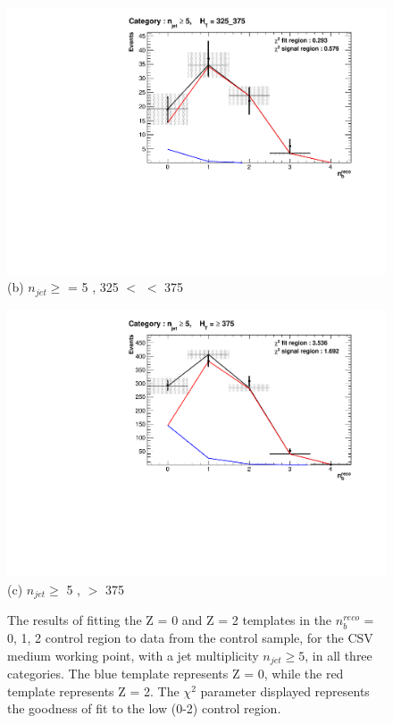 \begin{figure}[ht]
\footnotesize
\centering
\begin{minipage}[b]{0.50\linewidth}
\includegraphics[width = 1.0\linewidth]{plots/ThesisPlots/Final_Fit_To_Data_Normal_Medium_HTBin_OneMuon_325_375_jet_mult_5.pdf}
\centering (b) $n_{jet} \geq$ = 5 , 325 $<$ \theht $<$ 375 
\end{minipage}
\footnotesize
\begin{minipage}[b]{0.51\linewidth}
\centering
\includegraphics[width = 1.0\linewidth]{plots/ThesisPlots/Final_Fit_To_Data_Normal_Medium_HTBin_OneMuon_Template_375_jet_mult_5.pdf}
\centering (c) $n_{jet} \geq$ 5 , \theht $>$ 375 
\end{minipage}
\caption[The results of fitting the Z = 0 and Z = 2 templates in the $n_{b}^{reco}$ = 0, 1, 2 control region to data from the \mupjets control sample, for the \ac{CSV} medium working point, with a jet multiplicity $n_{jet} \geq 5$, in all three \theht categories.]{The results of fitting the Z = 0 and Z = 2 templates in the $n_{b}^{reco}$ = 0, 1, 2 control region to data from the \mupjets control sample, for the \ac{CSV} medium working point, with a jet multiplicity $n_{jet} \geq 5$, in all three \theht categories. The blue template represents Z = 0, while the red template represents Z = 2. The $\chi^{2}$ parameter displayed represents the goodness of fit to the low \nbreco (0-2) control region.}
\label{fig:template_data_med_njet5}
\end{figure}
